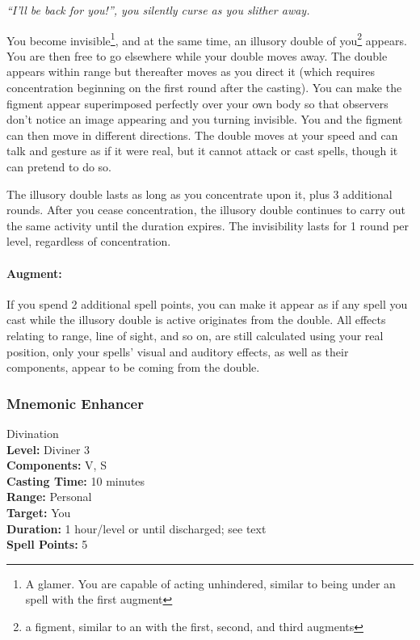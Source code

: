 \emph{``I'll be back for you!'', you silently curse as you slither away.}

You become invisible\footnote{A glamer. You are capable of acting unhindered, similar to being under an  spell with the first augment}, and at the same time, an illusory double of you\footnote{a figment, similar to an  with the first, second, and third augments} appears. You are then free to go elsewhere while your double moves away. 
The double appears within range but thereafter moves as you direct it (which requires concentration beginning on the first round after the casting). 
You can make the figment appear superimposed perfectly over your own body so that observers don't notice an image appearing and you turning invisible. 
You and the figment can then move in different directions. 
The double moves at your speed and can talk and gesture as if it were real, but it cannot attack or cast spells, though it can pretend to do so.

The illusory double lasts as long as you concentrate upon it, plus 3 additional rounds. After you cease concentration, 
the illusory double continues to carry out the same activity until the duration expires. 
The invisibility lasts for 1 round per level, regardless of concentration. 

\paragraph{Augment:} If you spend 2 additional spell points, you can make it appear as if any spell you cast while the illusory double is active originates from the double.
All effects relating to range, line of sight, and so on, are still calculated using your real position, only your spells' visual and auditory effects, as well as their components,
appear to be coming from the double.
\subsubsection{Mnemonic Enhancer}
\label{Spell:MnemonicEnhancer}
Divination
\\ \textbf{Level:} Diviner 3
\\ \textbf{Components:} V, S
\\ \textbf{Casting Time:} 10 minutes
\\ \textbf{Range:} Personal
\\ \textbf{Target:} You
\\ \textbf{Duration:} 1 hour/level or until discharged; see text
\\ \textbf{Spell Points:} 5

